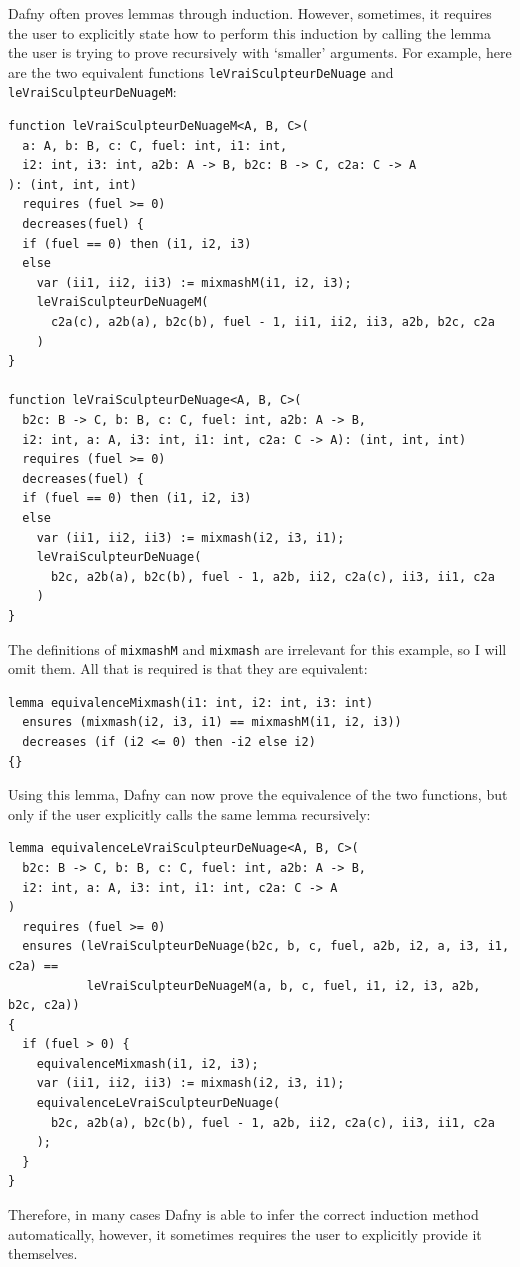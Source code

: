 \documentclass[a4paper, 11pt]{article}
\begin{document}
Dafny often proves lemmas through induction. However, sometimes, it requires the user to explicitly state how to perform this induction by calling the lemma the user is trying to prove recursively with `smaller' arguments. For example, here are the two equivalent functions \lstinline|leVraiSculpteurDeNuage| and \lstinline|leVraiSculpteurDeNuageM|:
\begin{lstlisting}[caption=\lstinline|leVraiSculpteurDeNuage| and \lstinline|leVraiSculpteurDeNuageM| Functions]
function leVraiSculpteurDeNuageM<A, B, C>(
  a: A, b: B, c: C, fuel: int, i1: int,
  i2: int, i3: int, a2b: A -> B, b2c: B -> C, c2a: C -> A
): (int, int, int)
  requires (fuel >= 0)
  decreases(fuel) {
  if (fuel == 0) then (i1, i2, i3)
  else
    var (ii1, ii2, ii3) := mixmashM(i1, i2, i3);
    leVraiSculpteurDeNuageM(
      c2a(c), a2b(a), b2c(b), fuel - 1, ii1, ii2, ii3, a2b, b2c, c2a
    )
}

function leVraiSculpteurDeNuage<A, B, C>(
  b2c: B -> C, b: B, c: C, fuel: int, a2b: A -> B,
  i2: int, a: A, i3: int, i1: int, c2a: C -> A): (int, int, int)
  requires (fuel >= 0)
  decreases(fuel) {
  if (fuel == 0) then (i1, i2, i3)
  else
    var (ii1, ii2, ii3) := mixmash(i2, i3, i1);
    leVraiSculpteurDeNuage(
      b2c, a2b(a), b2c(b), fuel - 1, a2b, ii2, c2a(c), ii3, ii1, c2a
    )
}
\end{lstlisting}
%
The definitions of \lstinline|mixmashM| and \lstinline|mixmash| are irrelevant for this example, so I will omit them. All that is required is that they are equivalent:
\begin{lstlisting}[caption=Equivalence Lemma for \lstinline|mixmashM| and \lstinline|mixmash|]
lemma equivalenceMixmash(i1: int, i2: int, i3: int)
  ensures (mixmash(i2, i3, i1) == mixmashM(i1, i2, i3))
  decreases (if (i2 <= 0) then -i2 else i2)
{}
\end{lstlisting}
%
Using this lemma, Dafny can now prove the equivalence of the two functions, but only if the user explicitly calls the same lemma recursively:
\begin{lstlisting}[caption=Equivalence Lemma for \lstinline|leVraiSculpteurDeNuageM| and \lstinline|leVraiSculpteurDeNuage|]
lemma equivalenceLeVraiSculpteurDeNuage<A, B, C>(
  b2c: B -> C, b: B, c: C, fuel: int, a2b: A -> B,
  i2: int, a: A, i3: int, i1: int, c2a: C -> A
)
  requires (fuel >= 0)
  ensures (leVraiSculpteurDeNuage(b2c, b, c, fuel, a2b, i2, a, i3, i1, c2a) ==
           leVraiSculpteurDeNuageM(a, b, c, fuel, i1, i2, i3, a2b, b2c, c2a))
{
  if (fuel > 0) {
    equivalenceMixmash(i1, i2, i3);
    var (ii1, ii2, ii3) := mixmash(i2, i3, i1);
    equivalenceLeVraiSculpteurDeNuage(
      b2c, a2b(a), b2c(b), fuel - 1, a2b, ii2, c2a(c), ii3, ii1, c2a
    );
  }
}
\end{lstlisting}
%
Therefore, in many cases Dafny is able to infer the correct induction method automatically, however, it sometimes requires the user to explicitly provide it themselves.
\end{document}
